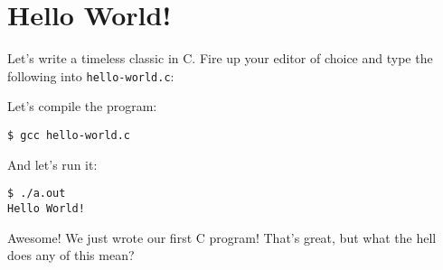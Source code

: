 %

\chapter{Hello World!}

Let's write a timeless classic in C.  Fire up your editor of choice and
type the following into \texttt{hello-world.c}:


\noindent
Let's compile the program:
\begin{verbatim}
$ gcc hello-world.c
\end{verbatim}
And let's run it:
\begin{verbatim}
$ ./a.out
Hello World!
\end{verbatim}
Awesome!  We just wrote our first C program!  That’s great, but what the
hell does any of this mean?
